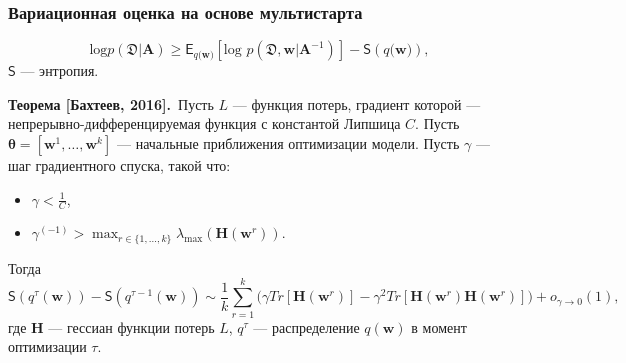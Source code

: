 \documentclass[11pt,pdf,utf8,russian,aspectratio=169]{beamer}
\begin{document}
\begin{frame}
\frametitle{Вариационная оценка на основе мультистарта}
$$\text{log}p(\mathfrak{D}|\mathbf{A}) \geq \mathsf{E}_{q(\mathbf{w)}}[\text{log~}p (\mathfrak{D}, \mathbf{w}| \mathbf{A}^{-1})] - \mathsf{S}({q(\mathbf{w)}}),$$
$\mathsf{S}$ --- энтропия.

\textbf{Теорема [Бахтеев, 2016].}~Пусть $L$ --- функция потерь, градиент которой ---  непрерывно-дифференцируемая функция с константой Липшица $C$. Пусть $\boldsymbol{\theta} = [\mathbf{w}^1,\dots,\mathbf{w}^k]$ ---  начальные приближения оптимизации модели. Пусть $\gamma$ --- шаг градиентного спуска, такой что:
\begin{itemize}
\item $\gamma<\frac{1}{C}$,
\item $\gamma^{(-1)} > \max_{r \in \{1,\dots,k\}}\lambda_\text{max} (\mathbf{H}(\mathbf{w}^r))$.
\end{itemize}
Тогда
\small
\[
	\mathsf{S}(q^\tau(\mathbf{w})) -  \mathsf{S}(q^{\tau-1}(\mathbf{w}))  \sim  \frac{1}{k}\sum_{r=1}^k \bigl(\gamma Tr[\mathbf{H}(\mathbf{w}^r)] - \gamma^2 Tr[\mathbf{H}(\mathbf{w}^r)\mathbf{H}(\mathbf{w}^r)]  \bigr) + o_{\gamma \to 0}(1),
\]
где $\mathbf{H}$ --- гессиан функции потерь $L$, $q^\tau$ --- распределение $q(\mathbf{w})$ в момент оптимизации $\tau$.
\end{frame}
\end{document}
